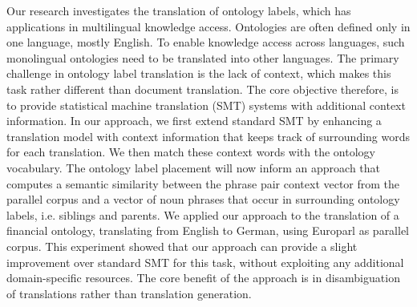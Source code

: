 Our research investigates the translation of ontology labels, which has applications in multilingual knowledge access. Ontologies are often defined
 only in one language, mostly English. To enable knowledge access across
 languages, such monolingual ontologies need to be translated into other
 languages. The primary challenge in ontology label translation is the lack of
 context, which makes this task rather different than document translation. The
 core objective therefore, is to provide statistical machine translation (SMT)
 systems with additional context information. In our approach, we first extend
 standard SMT by enhancing a translation model with context information that
 keeps track of surrounding words for each translation. We then match these
 context words with the ontology vocabulary. The ontology label placement will
 now inform an approach that computes a semantic similarity between the phrase
 pair context vector from the parallel corpus and a vector of noun phrases that
 occur in surrounding ontology labels, i.e. siblings and parents. We applied our
 approach to the translation of a financial ontology, translating from English
 to German, using Europarl as parallel corpus. This experiment showed that our
 approach can provide a slight improvement over standard SMT for this task,
 without exploiting any additional domain-specific resources. The core benefit
 of the approach is in disambiguation of translations rather than translation
 generation.

